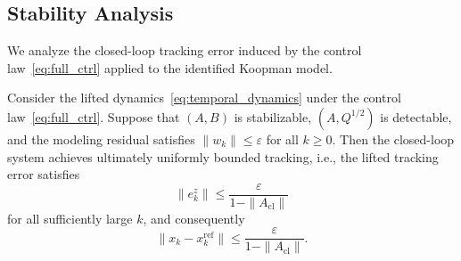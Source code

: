 \subsection{Stability Analysis}
\label{subsec:stability}

We analyze the closed-loop tracking error induced by the control law~\eqref{eq:full_ctrl} applied to the identified Koopman model.

\begin{theorem}
\label{thm:ub}
Consider the lifted dynamics~\eqref{eq:temporal_dynamics} under the control law~\eqref{eq:full_ctrl}. Suppose that $(A, B)$ is stabilizable, $(A, Q^{1/2})$ is detectable, and the modeling residual satisfies $\|w_k\| \leq \varepsilon$ for all $k \geq 0$. Then the closed-loop system achieves ultimately uniformly bounded tracking, i.e., the lifted tracking error satisfies
\begin{equation}
    \|e_k^z\| \leq \frac{\varepsilon}{1 - \|A_{\mathrm{cl}}\|}
    \label{eq:ub_bound}
\end{equation}
for all sufficiently large $k$, and consequently
\begin{equation}
    \|x_k - x_k^{\mathrm{ref}}\| \leq \frac{\varepsilon}{1 - \|A_{\mathrm{cl}}\|}.
    \label{eq:phys_bound}
\end{equation}
\end{theorem}

